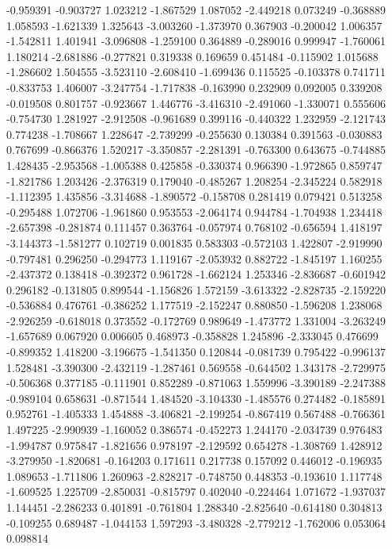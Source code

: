 -0.959391
-0.903727
1.023212
-1.867529
1.087052
-2.449218
0.073249
-0.368889
1.058593
-1.621339
1.325643
-3.003260
-1.373970
0.367903
-0.200042
1.006357
-1.542811
1.401941
-3.096808
-1.259100
0.364889
-0.289016
0.999947
-1.760061
1.180214
-2.681886
-0.277821
0.319338
0.169659
0.451484
-0.115902
1.015688
-1.286602
1.504555
-3.523110
-2.608410
-1.699436
0.115525
-0.103378
0.741711
-0.833753
1.406007
-3.247754
-1.717838
-0.163990
0.232909
0.092005
0.339208
-0.019508
0.801757
-0.923667
1.446776
-3.416310
-2.491060
-1.330071
0.555606
-0.754730
1.281927
-2.912508
-0.961689
0.399116
-0.440322
1.232959
-2.121743
0.774238
-1.708667
1.228647
-2.739299
-0.255630
0.130384
0.391563
-0.030883
0.767699
-0.866376
1.520217
-3.350857
-2.281391
-0.763300
0.643675
-0.744885
1.428435
-2.953568
-1.005388
0.425858
-0.330374
0.966390
-1.972865
0.859747
-1.821786
1.203426
-2.376319
0.179040
-0.485267
1.208254
-2.345224
0.582918
-1.112395
1.435856
-3.314688
-1.890572
-0.158708
0.281419
0.079421
0.513258
-0.295488
1.072706
-1.961860
0.953553
-2.064174
0.944784
-1.704938
1.234418
-2.657398
-0.281874
0.111457
0.363764
-0.057974
0.768102
-0.656594
1.418197
-3.144373
-1.581277
0.102719
0.001835
0.583303
-0.572103
1.422807
-2.919990
-0.797481
0.296250
-0.294773
1.119167
-2.053932
0.882722
-1.845197
1.160255
-2.437372
0.138418
-0.392372
0.961728
-1.662124
1.253346
-2.836687
-0.601942
0.296182
-0.131805
0.899544
-1.156826
1.572159
-3.613322
-2.828735
-2.159220
-0.536884
0.476761
-0.386252
1.177519
-2.152247
0.880850
-1.596208
1.238068
-2.926259
-0.618018
0.373552
-0.172769
0.989649
-1.473772
1.331004
-3.263249
-1.657689
0.067920
0.006605
0.468973
-0.358828
1.245896
-2.333045
0.476699
-0.899352
1.418200
-3.196675
-1.541350
0.120844
-0.081739
0.795422
-0.996137
1.528481
-3.390300
-2.432119
-1.287461
0.569558
-0.644502
1.343178
-2.729975
-0.506368
0.377185
-0.111901
0.852289
-0.871063
1.559996
-3.390189
-2.247388
-0.989104
0.658631
-0.871544
1.484520
-3.104330
-1.485576
0.274482
-0.185891
0.952761
-1.405333
1.454888
-3.406821
-2.199254
-0.867419
0.567488
-0.766361
1.497225
-2.990939
-1.160052
0.386574
-0.452273
1.244170
-2.034739
0.976483
-1.994787
0.975847
-1.821656
0.978197
-2.129592
0.654278
-1.308769
1.428912
-3.279950
-1.820681
-0.164203
0.171611
0.217738
0.157092
0.446012
-0.196935
1.089653
-1.711806
1.260963
-2.828217
-0.748750
0.448353
-0.193610
1.117748
-1.609525
1.225709
-2.850031
-0.815797
0.402040
-0.224464
1.071672
-1.937037
1.144451
-2.286233
0.401891
-0.761804
1.288340
-2.825640
-0.614180
0.304813
-0.109255
0.689487
-1.044153
1.597293
-3.480328
-2.779212
-1.762006
0.053064
0.098814
